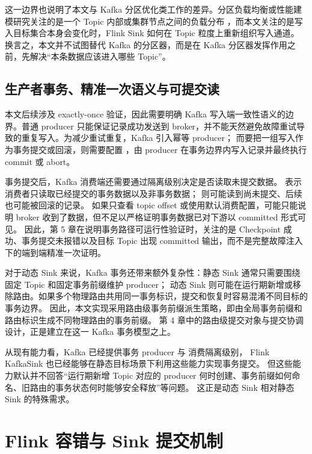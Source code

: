 这一边界也说明了本文与 Kafka 分区优化类工作的差异。分区负载均衡或性能建模研究关注的是一个 Topic 内部或集群节点之间的负载分布
\cite{wang2022astraea,wu2021logp}，而本文关注的是写入目标集合本身会变化时，Flink Sink 如何在 Topic 粒度上重新组织写入通道。
换言之，本文并不试图替代 Kafka 的分区器，而是在 Kafka 分区器发挥作用之前，先解决“本条数据应该进入哪些 Topic”。

\subsection{生产者事务、精准一次语义与可提交读}

本文后续涉及 exactly-once 验证，因此需要明确 Kafka 写入端一致性语义的边界。普通 producer
只能保证记录成功发送到 broker，并不能天然避免故障重试导致的重复写入。为减少重试重复，Kafka 引入幂等 producer；
而要把一组写入作为事务提交或回滚，则需要配置 ，由 producer 在事务边界内写入记录并最终执行 commit 或 abort\cite{kafkaSemantics}。

事务提交后，Kafka 消费端还需要通过隔离级别决定是否读取未提交数据。
表示消费者只读取已经提交的事务数据以及非事务数据； 则可能读到尚未提交、后续也可能被回滚的记录。
如果只查看 topic offset 或使用默认消费配置，可能只能说明 broker 收到了数据，但不足以严格证明事务数据已对下游以 committed 形式可见。
因此，第 5 章在说明事务路径可运行性验证时，关注的是 Checkpoint 成功、事务提交未报错以及目标 Topic 出现 committed 输出，而不是完整故障注入下的端到端精准一次证明。

对于动态 Sink 来说，Kafka 事务还带来额外复杂性：静态 Sink 通常只需要围绕固定 Topic 和固定事务前缀维护 producer；
动态 Sink 则可能在运行期新增或移除路由。如果多个物理路由共用同一事务标识，提交和恢复时容易混淆不同目标的事务边界。
因此，本文实现采用路由级事务前缀派生策略，即由全局事务前缀和路由标识生成不同物理路由的事务前缀。
第 4 章中的路由级提交对象与提交协调设计，正是建立在这一 Kafka 事务模型之上。

从现有能力看，Kafka 已经提供事务 producer 与  消费隔离级别，
Flink KafkaSink 也已经能够在静态目标场景下利用这些能力实现事务提交\cite{flinkKafkaDocs,kafkaSemantics}。
但这些能力默认并不回答“运行期新增 Topic 对应的 producer 何时创建、事务前缀如何命名、旧路由的事务状态何时能够安全释放”等问题。
这正是动态 Sink 相对静态 Sink 的特殊需求。

\section{Flink 容错与 Sink 提交机制}

